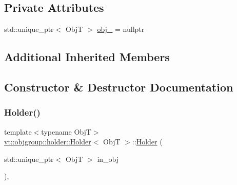 \subsection*{Private Attributes}
\begin{DoxyCompactItemize}
\item 
std\+::unique\+\_\+ptr$<$ ObjT $>$ \hyperlink{structvt_1_1objgroup_1_1holder_1_1_holder_a098ec3be989e0d95a1ad8d1a31db3eb2}{obj\+\_\+} = nullptr
\end{DoxyCompactItemize}
\subsection*{Additional Inherited Members}


\subsection{Constructor \& Destructor Documentation}
\mbox{\label{structvt_1_1objgroup_1_1holder_1_1_holder_a7e21e5a25aaef942ad43d07e14e726eb}} 
\subsubsection{\texorpdfstring{Holder()}{Holder()}}
{\footnotesize\ttfamily template$<$typename ObjT$>$ \\
\hyperlink{structvt_1_1objgroup_1_1holder_1_1_holder}{vt\+::objgroup\+::holder\+::\+Holder}$<$ ObjT $>$\+::\hyperlink{structvt_1_1objgroup_1_1holder_1_1_holder}{Holder} (\begin{DoxyParamCaption}\item[{std\+::unique\+\_\+ptr$<$ ObjT $>$}]{in\+\_\+obj }\end{DoxyParamCaption})\hspace{0.3cm}{\ttfamily [inline]}, {\ttfamily [explicit]}}

\mbox{\label{structvt_1_1objgroup_1_1holder_1_1_holder_acc7eb26ff3152043f63164898469fc78}} 
